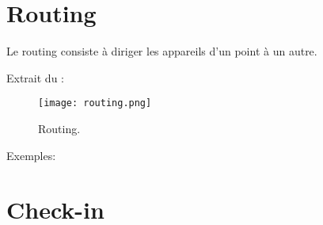 \section{Routing}
\begin{e1}
	\item Le routing consiste à diriger les appareils d’un point à un autre.
	\item Extrait du \jp:\\
	\begin{figure}[H]
		\texttt{[image: routing.png]}
		\caption{Routing.}
		\label{fig:routing}
	\end{figure}
	\item Exemples:\\
\end{e1}

\section{Check-in}


